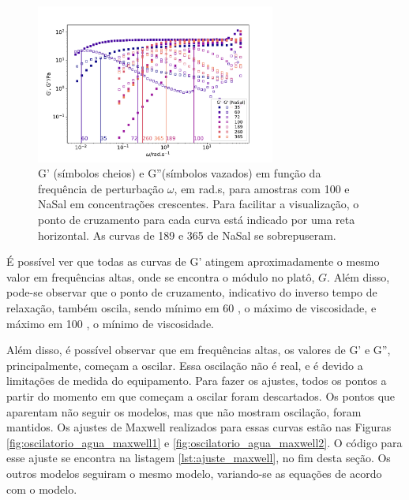 		\begin{figure}[h]
			\centering
			\includegraphics[width=0.7\textwidth]{imagens/reologia/oscilatorio_agua}
			\caption{G' (símbolos cheios) e G''(símbolos vazados) em função da frequência de perturbação \(\omega\), em rad.s\menosUm, para amostras com \CTAB{} 100 \mM{} e NaSal em concentrações crescentes. Para facilitar a visualização, o ponto de cruzamento para cada curva está indicado por uma reta horizontal. As curvas de 189 e 365 \mM{} de NaSal se sobrepuseram.}
			\label{fig:oscilatorio_agua}
		\end{figure}
		
		É possível ver que todas as curvas de G' atingem aproximadamente o mesmo valor em frequências altas, onde se encontra o módulo no platô, \(G\). Além disso, pode-se observar que o ponto de cruzamento, indicativo do inverso tempo de relaxação, também oscila, sendo mínimo em 60 \mM, o máximo de viscosidade, e máximo em 100 \mM, o mínimo de viscosidade. 
		
		Além disso, é possível observar que em frequências altas, os valores de G' e G'', principalmente, começam a oscilar. Essa oscilação não é real, e é devido a limitações de medida do equipamento. Para fazer os ajustes, todos os pontos a partir do momento em que começam a oscilar foram descartados. Os pontos que aparentam não seguir os modelos, mas que não mostram oscilação, foram mantidos. Os ajustes de Maxwell realizados para essas curvas estão nas Figuras \ref{fig:oscilatorio_agua_maxwell1} e \ref{fig:oscilatorio_agua_maxwell2}. O código para esse ajuste se encontra na listagem \ref{lst:ajuste_maxwell}, no fim desta seção. Os outros modelos seguiram o mesmo modelo, variando-se as equações de acordo com o modelo.
				
